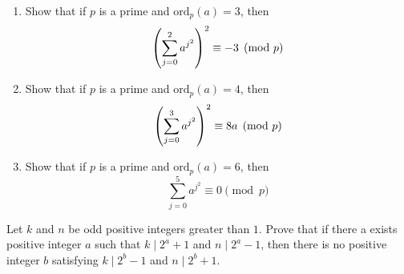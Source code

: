 \begin{problem}
	$ $
	\begin{enumerate}
		\item Show that if $p$ is a prime and $\text{ord}_p(a)=3$, then \[\left(\sum_{j=0}^{2}a^{j^{2}}\right)^{2}\equiv{-3}\pmod{p}\]

		\item Show that if $p$ is a prime and $\text{ord}_p(a)=4$, then \[\left(\sum_{j=0}^{3}a^{j^{2}}\right)^{2}\equiv{8a}\pmod{p}\]

		\item Show that if $p$ is a prime and $\text{ord}_p(a)=6$, then \[\sum_{j=0}^{5}a^{j^{2}}\equiv{0}\pmod{p}\]
	\end{enumerate}
\end{problem}

%
%

\begin{problem}[Poland 2016]
	Let $k$ and $n$ be odd positive integers greater than $1$. Prove that if there a exists positive integer $a$ such that $k \mid 2^a+1$ and $n \mid 2^a-1$, then there is no positive integer $b$ satisfying $k \mid 2^b-1$ and  $n \mid 2^b+1$. %
\end{problem}


